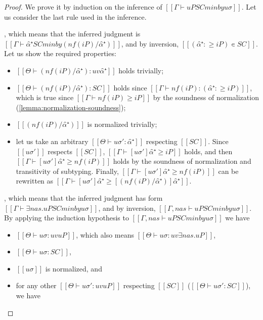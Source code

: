 \lemMinInstSoundness*
\begin{proof}
    We prove it by induction on the inference of $[[Γ ⊢ uP SC minby uσ ]]$.
    Let us consider the last rule used in the inference.
    \begin{caseof}
        \item {}, which means 
            that the inferred judgment is $[[Γ ⊢  α̂⁺ SC minby (nf(iP) / α̂⁺)]]$, 
            and by inversion, $[[(α̂⁺ :≥ iP) ∊ SC]]$. Let us show the required properties:
            \begin{itemize}
                \item $[[Θ ⊢ (nf(iP) / α̂⁺) : uv α̂⁺]]$ holds trivially;
                \item $[[Θ ⊢  (nf(iP) / α̂⁺) : SC]]$ holds since
                    $[[Γ ⊢ nf(iP) : (α̂⁺ :≥ iP)]]$, which is true 
                    since $[[Γ ⊢ nf(iP) ≥ iP]]$ by the soundness of normalization
                    (\cref{lemma:normalization-soundness});
                \item $[[(nf(iP) / α̂⁺)]]$ is normalized trivially;
                \item let us take an arbitrary $[[Θ ⊢ uσ' : {α̂⁺} ]]$
                    respecting $[[SC]]$. Since $[[uσ']]$ respects $[[SC]]$,
                    $[[Γ ⊢ [uσ']α̂⁺ ≥ iP]]$ holds, and then
                    $[[Γ ⊢ [uσ']α̂⁺ ≥ nf(iP)]]$ holds by the soundness of normalization
                    and transitivity of subtyping. Finally,
                    $[[Γ ⊢ [uσ']α̂⁺ ≥ nf(iP)]]$ can be rewritten as
                    $[[Γ ⊢ [uσ']α̂⁺ ≥ [(nf(iP) / α̂⁺)]α̂⁺]]$.
            \end{itemize}
        \item {}, which means that 
            the inferred judgment has form $[[Γ ⊢ ∃nas.uP SC minby uσ ]]$,
            and by inversion, $[[Γ, nas ⊢ uP SC minby uσ]]$.
            By applying the induction hypothesis to $[[Γ, nas ⊢ uP SC minby uσ]]$
            we have 
            \begin{itemize}
                \item $[[Θ ⊢ uσ : uv uP]]$, which also means $[[Θ ⊢ uσ : uv ∃nas.uP]]$,
                \item $[[Θ ⊢ uσ : SC]]$,
                \item $[[uσ]]$ is normalized, and
                \item for any other $[[Θ ⊢ uσ' : uv uP ]]$
                    respecting $[[SC]]$ (\ie $[[Θ ⊢ uσ' : SC]]$), we have

\end{itemize}
\end{caseof}
\end{proof}
